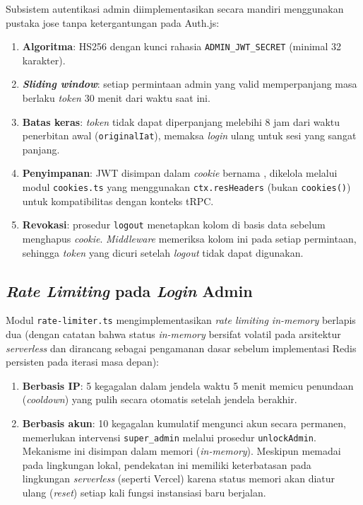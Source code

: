 Subsistem autentikasi admin diimplementasikan secara mandiri menggunakan pustaka jose tanpa ketergantungan pada Auth.js:

\begin{enumerate}[leftmargin=2cm]
  \item \textbf{Algoritma}: HS256 dengan kunci rahasia \texttt{ADMIN\_JWT\_SECRET} (minimal 32 karakter).
  \item \textbf{\textit{Sliding window}}: setiap permintaan admin yang valid memperpanjang masa berlaku \textit{token} 30 menit dari waktu saat ini.
  \item \textbf{Batas keras}: \textit{token} tidak dapat diperpanjang melebihi 8 jam dari waktu penerbitan awal (\texttt{originalIat}), memaksa \textit{login} ulang untuk sesi yang sangat panjang.
  \item \textbf{Penyimpanan}: JWT disimpan dalam \textit{cookie} bernama \texttt{}, dikelola melalui modul \texttt{cookies.ts} yang menggunakan \texttt{ctx.resHeaders} (bukan \texttt{cookies()}) untuk kompatibilitas dengan konteks tRPC.
  \item \textbf{Revokasi}: prosedur \texttt{logout} menetapkan kolom \texttt{} di basis data sebelum menghapus \textit{cookie}. \textit{Middleware} \texttt{} memeriksa kolom ini pada setiap permintaan, sehingga \textit{token} yang dicuri setelah \textit{logout} tidak dapat digunakan.
\end{enumerate}

\subsection{\textit{Rate Limiting} pada \textit{Login} Admin}

Modul \texttt{rate-limiter.ts} mengimplementasikan \textit{rate limiting in-memory} berlapis dua (dengan catatan bahwa status \textit{in-memory} bersifat volatil pada arsitektur \textit{serverless} dan dirancang sebagai pengamanan dasar sebelum implementasi Redis persisten pada iterasi masa depan):

\begin{enumerate}[leftmargin=2cm]
  \item \textbf{Berbasis IP}: 5 kegagalan dalam jendela waktu 5 menit memicu penundaan (\textit{cooldown}) yang pulih secara otomatis setelah jendela berakhir.
  \item \textbf{Berbasis akun}: 10 kegagalan kumulatif mengunci akun secara permanen, memerlukan intervensi \texttt{super\_admin} melalui prosedur \texttt{unlockAdmin}. Mekanisme ini disimpan dalam memori (\textit{in-memory}). Meskipun memadai pada lingkungan lokal, pendekatan ini memiliki keterbatasan pada lingkungan \textit{serverless} (seperti Vercel) karena status memori akan diatur ulang (\textit{reset}) setiap kali fungsi instansiasi baru berjalan.
\end{enumerate}

